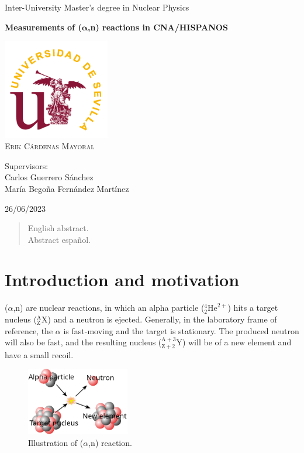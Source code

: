 \documentclass[a4paper,12pt]{report}
\newcommand{\an}{($\alpha$,n) }
\begin{document}
\begin{titlepage}
	\centering
	\Huge Inter-University Master's degree in Nuclear Physics\par
	\vspace*{3cm}
	\HUGE \textbf{Measurements of ($\bm{\alpha}$,n) reactions in CNA/HISPANOS}\par	%
	\vspace{1cm}
	\includegraphics[width=0.35\textwidth]{us.png}\\
	\vspace{1cm}
	\Large \textsc{Erik Cárdenas Mayoral}\par
	\vspace{2cm}
	Supervisors:\\
	Carlos Guerrero Sánchez\\
	María Begoña Fernández Martínez\par
	\vfill
	26/06/2023
\end{titlepage}

\begin{abstract}
English abstract.
\\
Abstract español.
\end{abstract}

\tableofcontents

\chapter{Introduction and motivation}
\an are nuclear reactions, in which an alpha particle ($^4_2\text{He}^{2+}$) hits a target nucleus ($^\text{A}_\text{Z}\text{X}$) and a neutron is ejected.
Generally, in the laboratory frame of reference, the $\alpha$ is fast-moving and the target is stationary.
The produced neutron will also be fast, and the resulting nucleus ($^{\text{A}+3}_{\text{Z}+2}\text{Y}$) will be of a new element and have a small recoil.

\begin{figure}[H]
	\centering
	\includegraphics[width=0.4\textwidth]{anreaction.png}
	\caption{Illustration of \an reaction.}
	\label{anreaction}
\end{figure}
\end{document}
